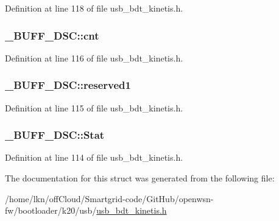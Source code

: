 Definition at line 118 of file usb\+\_\+bdt\+\_\+kinetis.\+h.

\subsubsection[{\texorpdfstring{cnt}{cnt}}]{ \+\_\+\+B\+U\+F\+F\+\_\+\+D\+S\+C\+::cnt}\hypertarget{struct___b_u_f_f___d_s_c_a4c16226928723a914f57268c1b075f22}{}\label{struct___b_u_f_f___d_s_c_a4c16226928723a914f57268c1b075f22}


Definition at line 116 of file usb\+\_\+bdt\+\_\+kinetis.\+h.

\subsubsection[{\texorpdfstring{reserved1}{reserved1}}]{ \+\_\+\+B\+U\+F\+F\+\_\+\+D\+S\+C\+::reserved1}\hypertarget{struct___b_u_f_f___d_s_c_ad5826cefe57fbcea9f3c3624d5a67b05}{}\label{struct___b_u_f_f___d_s_c_ad5826cefe57fbcea9f3c3624d5a67b05}


Definition at line 115 of file usb\+\_\+bdt\+\_\+kinetis.\+h.

\subsubsection[{\texorpdfstring{Stat}{Stat}}]{ \+\_\+\+B\+U\+F\+F\+\_\+\+D\+S\+C\+::\+Stat}\hypertarget{struct___b_u_f_f___d_s_c_ae0eb7baa3083e9dab5b9d40eb2afb51c}{}\label{struct___b_u_f_f___d_s_c_ae0eb7baa3083e9dab5b9d40eb2afb51c}


Definition at line 114 of file usb\+\_\+bdt\+\_\+kinetis.\+h.



The documentation for this struct was generated from the following file\+:\begin{DoxyCompactItemize}
\item 
/home/lkn/off\+Cloud/\+Smartgrid-\/code/\+Git\+Hub/openwsn-\/fw/bootloader/k20/usb/\hyperlink{usb__bdt__kinetis_8h}{usb\+\_\+bdt\+\_\+kinetis.\+h}\end{DoxyCompactItemize}
